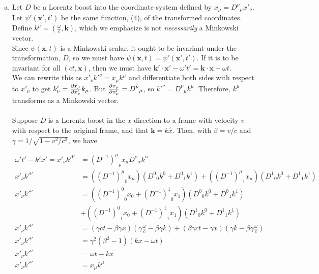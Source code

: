 \documentclass[]{article}
\begin{document}
\begin{enumerate}[a)]
\item Let $D$ be a Lorentz boost into the coordinate system defined by $x_\mu = {D^{\nu}}_\mu x'_\nu$. Let $\psi'(\bm{x}',t')$ be the same function, (4), of the transformed coordinates. Define $k^\mu = (\frac{\omega}{c},\bm{k})$, which we emphasize is not {\it necessarily} a Minkowski vector. \\
Since $\psi (\bm{x},t)$ is a Minkowski scalar, it ought to be invariant under the transformation, $D$, so we must have $\psi (\bm{x},t) = \psi'(\bm{x}',t')$. If it is to be invariant for all $(ct,\bm{x})$, then we must have $\bm{k}'\cdot\bm{x}' - \omega't' = \bm{k}\cdot\bm{x} - \omega t$. \\
We can rewrite this as $x'_\nu k'^\nu  = x_\mu k^\mu$ and differentiate both sides with respect to $x'_\nu$ to get $ k'_\nu = \pdv{x_\mu}{x'_\nu}k_\mu$. But $\pdv{x_\mu}{x'_\nu} = {D^\nu}_\mu$, so $  k'^\nu =  {D^\nu}_\mu k^\mu$. Therefore, $k^\mu$ transforms as a Minkowski vector.  \\ 
\hfill \\
Suppose $D$ is a Lorentz boost in the $x$-direction to a frame with velocity $v$ with respect to the original frame, and that $\bm{k}=k\hat{x}$. Then, with $\beta = v/c$ and $\gamma = 1/\sqrt{1-v^2/c^2}$, we have

\begin{equation}
\begin{split}
 \omega't' - k'x'  = x'_\nu k'^\nu & = {(D^{-1})^\mu}_\nu x_\mu {D^\nu}_\alpha k^\alpha \\
x'_\nu k'^\nu & =  ({(D^{-1})^\mu}_0 x_\mu )( {D^0}_0 k^ 0 + {D^0}_1 k^1) + ({(D^{-1})^\mu}_1 x_\mu )( {D^1}_0 k^ 0 + {D^1}_1 k^1) \\
x'_\nu k'^\nu & =  ({(D^{-1})^0}_0 x_0 + {(D^{-1})^1}_0 x_1)( {D^0}_0 k^ 0 + {D^0}_1 k^1) \\ &+ ({(D^{-1})^0}_1 x_0  +  {(D^{-1})^1}_1 x_1)( {D^1}_0 k^ 0 + {D^1}_1 k^1) \\
x'_\nu k'^\nu & =  (\gamma ct - \beta \gamma x)( \gamma\frac{\omega}{c} -\beta\gamma k) + (\beta\gamma ct - \gamma x)( \gamma k -\beta\gamma \frac{\omega}{c}) \\
x'_\nu k'^\nu & = \gamma^2(\beta^2 - 1)( kx  - \omega t) \\
x'_\nu k'^\nu & = \omega t - kx   \\
x'_\nu k'^\nu & = x_\mu k^\mu \\
\end{split}
\end{equation}

\end{enumerate}
\end{document}

